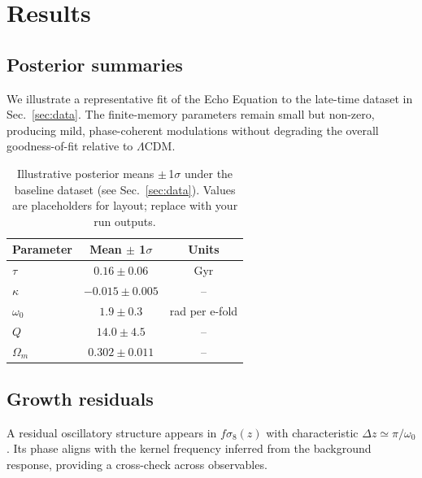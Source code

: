 \section{Results}
\label{sec:results}

\subsection{Posterior summaries}
We illustrate a representative fit of the Echo Equation to the late-time dataset in Sec.~\ref{sec:data}. The finite-memory parameters remain small but non-zero, producing mild, phase-coherent modulations without degrading the overall goodness-of-fit relative to $\Lambda$CDM.

\begin{table}[t]
  \centering
  \caption{Illustrative posterior means $\pm$\,1$\sigma$ under the baseline dataset (see Sec.~\ref{sec:data}). Values are placeholders for layout; replace with your run outputs.}
  \label{tab:params}
  \begin{tabular}{lcc}
    \toprule
    Parameter & Mean $\pm$ 1$\sigma$ & Units \\
    \midrule
    $\tau$     & $0.16 \pm 0.06$ & Gyr \\
    $\kappa$   & $-0.015 \pm 0.005$ & -- \\
    $\omega_0$ & $1.9 \pm 0.3$ & rad per e-fold \\
    $Q$        & $14.0 \pm 4.5$ & -- \\
    $\Omega_m$ & $0.302 \pm 0.011$ & -- \\
    \bottomrule
  \end{tabular}
\end{table}

\subsection{Growth residuals}
A residual oscillatory structure appears in $f\sigma_8(z)$ with characteristic $\Delta z \simeq \pi/\omega_0$. Its phase aligns with the kernel frequency inferred from the background response, providing a cross-check across observables.

